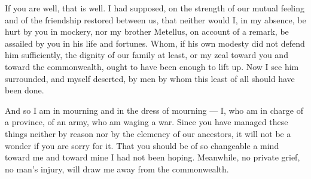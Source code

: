 %


 If you are well, that is well. I had supposed, on the strength of our mutual feeling and of the friendship restored between us, that neither would I, in my absence, be hurt by you in mockery, nor my brother Metellus, on account of a remark, be assailed by you in his life and fortunes. Whom, if his own modesty did not defend him sufficiently, the dignity of our family at least, or my zeal toward you and toward the commonwealth, ought to have been enough to lift up. Now I see him surrounded, and myself deserted, by men by whom this least of all should have been done.

 And so I am in mourning and in the dress of mourning --- I, who am in charge of a province, of an army, who am waging a war. Since you have managed these things neither by reason nor by the clemency of our ancestors, it will not be a wonder if you are sorry for it. That you should be of so changeable a mind toward me and toward mine I had not been hoping. Meanwhile, no private grief, no man's injury, will draw me away from the commonwealth.
